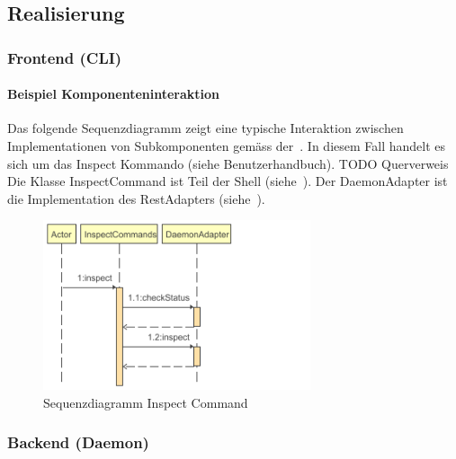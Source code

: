 \documentclass[a4paper,12pt]{report}
\begin{document}
    \clearpage

    \subsection{Realisierung}\label{subsec:realisierung}

    \subsubsection{Frontend (CLI)}
    \paragraph*{Beispiel Komponenteninteraktion}
    Das folgende Sequenzdiagramm zeigt eine typische Interaktion zwischen Implementationen von Subkomponenten gemäss der~.
    In diesem Fall handelt es sich um das Inspect Kommando (siehe Benutzerhandbuch). TODO Querverweis
    Die Klasse InspectCommand ist Teil der Shell (siehe~). Der DaemonAdapter ist die Implementation des RestAdapters (siehe~).
    \begin{figure}[h]
        \centering
        \includegraphics[width=0.7\textwidth]{assets/InspectCommands_inspect_seq_diag}
        \caption{Sequenzdiagramm Inspect Command}
        \label{fig:seq-diag-inspect-commands}
    \end{figure}

    \subsubsection{Backend (Daemon)}
\end{document}
